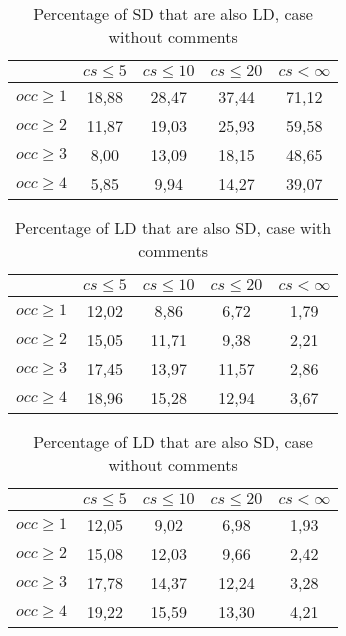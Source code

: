 \documentclass[a4paper,twoside]{article}
\begin{document}
\begin{table}[!h]
\renewcommand{\arraystretch}{1}
\caption{Percentage of SD that are also LD, case without comments}
\label{tab:percSD:nocomm}
\centering

\begin{tabular}{|c|c|c|c|c|}
\hline
	      &	$cs\leq 5$	&	$cs\leq 10$	&	$cs\leq 20$	&	$cs< \infty$	\\
\hline
$occ\geq 1$	&	18,88	&	28,47	&	37,44	&	71,12	\\
$occ\geq 2$	&	11,87	&	19,03	&	25,93	&	59,58	\\
$occ\geq 3$	&	8,00	&	13,09	&	18,15	&	48,65	\\
$occ\geq 4$	&	5,85	&	9,94	&	14,27	&	39,07	\\
\hline
\end{tabular}
\end{table}

\begin{table}[!h]
\renewcommand{\arraystretch}{1}
\caption{Percentage of LD that are also SD, case with comments}
\label{tab:percLD:comm}
\centering

\begin{tabular}{|c|c|c|c|c|}
\hline
	      &	$cs\leq 5$	&	$cs\leq 10$	&	$cs\leq 20$	&	$cs< \infty$	\\
\hline
$occ\geq 1$	&	12,02	&	8,86	&	6,72	&	1,79	\\
$occ\geq 2$	&	15,05	&	11,71	&	9,38	&	2,21	\\
$occ\geq 3$	&	17,45	&	13,97	&	11,57	&	2,86	\\
$occ\geq 4$	&	18,96	&	15,28	&	12,94	&	3,67	\\
\hline
\end{tabular}
\end{table}

\begin{table}[!h]
\renewcommand{\arraystretch}{1}
\caption{Percentage of LD that are also SD, case without comments}
\label{tab:percLD:nocomm}
\centering
\begin{tabular}{|c|c|c|c|c|}
\hline
	      &	$cs\leq 5$	&	$cs\leq 10$	&	$cs\leq 20$	&	$cs< \infty$	\\
\hline
$occ\geq 1$	&	12,05	&	9,02	&	6,98	&	1,93	\\
$occ\geq 2$	&	15,08	&	12,03	&	9,66	&	2,42	\\
$occ\geq 3$	&	17,78	&	14,37	&	12,24	&	3,28	\\
$occ\geq 4$	&	19,22	&	15,59	&	13,30	&	4,21	\\
\hline
\end{tabular}
\end{table}
\end{document}
